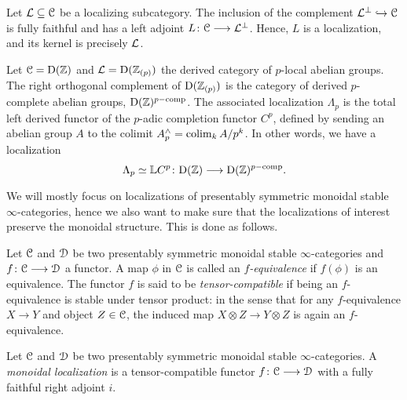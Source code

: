 \begin{example}
    \label{ch0:ex:localization-from-localizing-subcategory}
    Let $\mathcal{L}\subseteq \EuScript{C}$ be a localizing subcategory. The inclusion of the complement $\mathcal{L}^\perp \hookrightarrow \EuScript{C}$ is fully faithful and has a left adjoint $L\colon \EuScript{C}\longrightarrow \mathcal{L}^\perp$. Hence, $L$ is a localization, and its kernel is precisely $\mathcal{L}$. 
\end{example}

\begin{example}
    \label{ch0:ex:derived-p-completion}
    Let $\EuScript{C}=\mathrm{D}(\mathbb{Z})$ and $\mathcal{L} = \mathrm{D}(\mathbb{Z}_{(p)})$ the derived category of $p$-local abelian groups. The right orthogonal complement of $\mathrm{D}(\mathbb{Z}_{(p)})$ is the category of derived $p$-complete abelian groups, $\mathrm{D}(\mathbb{Z})^{p-\mathrm{comp}}$. The associated localization $\Lambda_p$ is the total left derived functor of the $p$-adic completion functor $C^p$, defined by sending an abelian group $A$ to the colimit $A^\wedge_p = \operatorname{colim}_k A/p^k$. In other words, we have a localization 
    \[\Lambda_p \simeq \mathbb{L} C^p \colon \mathrm{D}(\mathbb{Z})\longrightarrow \mathrm{D}(\mathbb{Z})^{p-\mathrm{comp}}.\]
\end{example}

We will mostly focus on localizations of presentably symmetric monoidal stable $\infty$-categories, hence we also want to make sure that the localizations of interest preserve the monoidal structure. This is done as follows. 

\begin{definition}
    \label{ch0:def:L-equivalence}
    Let $\EuScript{C}$ and $\EuScript{D}$ be two presentably symmetric monoidal stable $\infty$-categories and $f\colon \EuScript{C}\longrightarrow \EuScript{D}$ a functor. A map $\phi$ in $\EuScript{C}$ is called an \emph{$f$-equivalence} if $f(\phi)$ is an equivalence. The functor $f$ is said to be \emph{tensor-compatible} if being an $f$-equivalence is stable under tensor product: in the sense that for any $f$-equivalence $X\longrightarrow Y$ and object $Z\in \EuScript{C}$, the induced map $X\otimes Z\longrightarrow Y\otimes Z$ is again an $f$-equivalence. 
\end{definition}

\begin{definition}
    \label{ch0:def:monoidal-localization}
    Let $\EuScript{C}$ and $\EuScript{D}$ be two presentably symmetric monoidal stable $\infty$-categories. A \emph{monoidal localization} is a tensor-compatible functor $f\colon \EuScript{C}\longrightarrow \EuScript{D}$ with a fully faithful right adjoint $i$. 
\end{definition}

